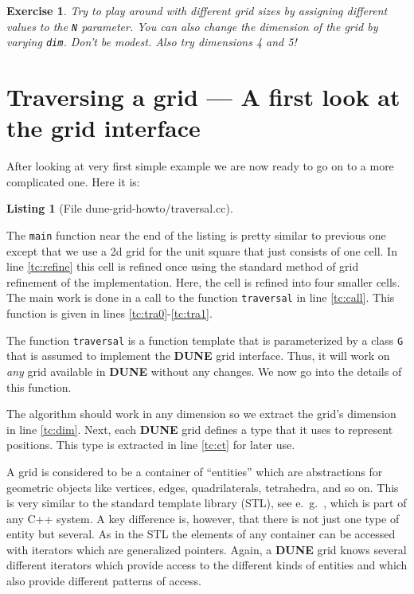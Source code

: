 \documentclass[11pt,a4paper,headinclude,footinclude,DIV16,normalheadings]{scrreprt}
\newcommand{\Dune}{{\sf\bfseries DUNE}}
\newtheorem{exc}{Exercise}[chapter]
\newtheorem{lst}{Listing}
\begin{document}
\begin{exc} Try to play around with different grid sizes by assigning
  different values to the \lstinline!N! parameter. You can also change
  the dimension of the grid by varying \lstinline!dim!. Don't be
  modest. Also try dimensions 4 and 5!
\end{exc}

\section{Traversing a grid --- A first look at the grid interface}

After looking at very first simple example we are now ready to go on
to a more complicated one. Here it is:

\begin{lst}[File dune-grid-howto/traversal.cc] \mbox{}
\nopagebreak

\end{lst}

The \lstinline!main! function near the end of the listing is pretty
similar to previous one except that we use a 2d grid for the unit
square that just consists of one cell. In line \ref{tc:refine} this
cell is refined once using the standard method of grid refinement of
the implementation. Here, the cell is refined into four smaller cells.
The main work is done in a call to the function \lstinline!traversal!
in line \ref{tc:call}.  This function is given in lines
\ref{tc:tra0}-\ref{tc:tra1}.

The function \lstinline!traversal! is a function template that is
parameterized by a class \lstinline!G! that is assumed to implement
the \Dune{} grid interface.  Thus, it will work on \textit{any} grid
available in \Dune{} without any changes. We now go into the details
of this function.

The algorithm should work in any dimension so we extract the grid's
dimension in line \ref{tc:dim}. Next, each \Dune{} grid defines a type
that it uses to represent positions. This type is extracted in line
\ref{tc:ct} for later use.

A grid is considered to be a container of ``entities'' which are
abstractions for geometric objects like vertices, edges,
quadrilaterals, tetrahedra, and so on. This is very similar to the
standard template library (STL), see e.~g.~\cite{Stroustrup},
which is part of any C++ system. 
A key difference is, however, that there is not just one type of entity but
several. As in the STL the elements of any container can be accessed
with iterators which are generalized pointers. Again, a \Dune{} grid
knows several different iterators which provide access to the
different kinds of entities and which also provide different patterns
of access. 
\end{document}
